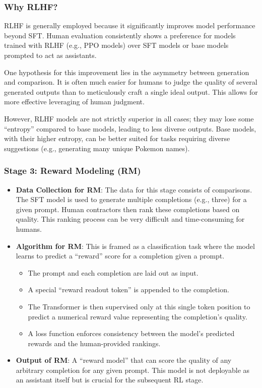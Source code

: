 \subsubsection{Why RLHF?}

RLHF is generally employed because it significantly improves model performance beyond SFT. Human evaluation consistently shows a preference for models trained with RLHF (e.g., PPO models) over SFT models or base models prompted to act as assistants.

One hypothesis for this improvement lies in the asymmetry between generation and comparison. It is often much easier for humans to judge the quality of several generated outputs than to meticulously craft a single ideal output. This allows for more effective leveraging of human judgment.

However, RLHF models are not strictly superior in all cases; they may lose some ``entropy'' compared to base models, leading to less diverse outputs. Base models, with their higher entropy, can be better suited for tasks requiring diverse suggestions (e.g., generating many unique Pokemon names).

\subsubsection{Stage 3: Reward Modeling (RM)}

\begin{itemize}
    \item \textbf{Data Collection for RM}: The data for this stage consists of comparisons. The SFT model is used to generate multiple completions (e.g., three) for a given prompt. Human contractors then rank these completions based on quality. This ranking process can be very difficult and time-consuming for humans.
    \item \textbf{Algorithm for RM}: This is framed as a classification task where the model learns to predict a ``reward'' score for a completion given a prompt.
        \begin{itemize}
            \item The prompt and each completion are laid out as input.
            \item A special ``reward readout token'' is appended to the completion.
            \item The Transformer is then supervised only at this single token position to predict a numerical reward value representing the completion's quality.
            \item A loss function enforces consistency between the model's predicted rewards and the human-provided rankings.
        \end{itemize}
    \item \textbf{Output of RM}: A ``reward model'' that can score the quality of any arbitrary completion for any given prompt. This model is not deployable as an assistant itself but is crucial for the subsequent RL stage.
\end{itemize}

